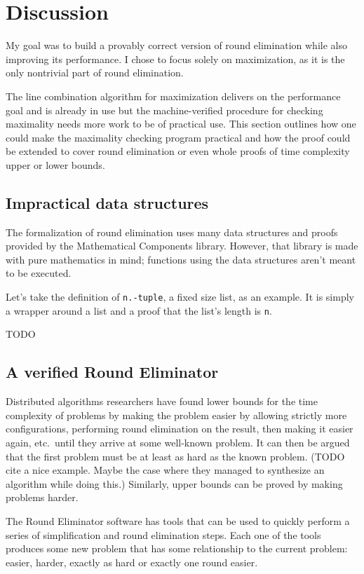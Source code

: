 \documentclass[english, 12pt, a4paper, sci, a-1b, online]{aaltothesis}
\newcommand\icoq[1]{\texttt{#1}}
\begin{document}
\section{Discussion}

My goal was to build a provably correct version of round elimination while also improving its performance. I chose to focus solely on maximization, as it is the only nontrivial part of round elimination.

The line combination algorithm for maximization delivers on the performance goal and is already in use but the machine-verified procedure for checking maximality needs more work to be of practical use. This section outlines how one could make the maximality checking program practical and how the proof could be extended to cover round elimination or even whole proofs of time complexity upper or lower bounds.

\subsection{Impractical data structures}\label{badds}

The formalization of round elimination uses many data structures and proofs provided by the Mathematical Components library. However, that library is made with pure mathematics in mind; functions using the data structures aren't meant to be executed.

Let's take the definition of \icoq{n.-tuple}, a fixed size list, as an example. It is simply a wrapper around a list and a proof that the list's length is \icoq{n}.

TODO

\subsection{A verified Round Eliminator}

Distributed algorithms researchers have found lower bounds for the time complexity of problems by making the problem easier by allowing strictly more configurations, performing round elimination on the result, then making it easier again, etc.\ until they arrive at some well-known problem. It can then be argued that the first problem must be at least as hard as the known problem. (TODO cite a nice example. Maybe the case where they managed to synthesize an algorithm while doing this.) Similarly, upper bounds can be proved by making problems harder.

The Round Eliminator software has tools that can be used to quickly perform a series of simplification and round elimination steps. Each one of the tools produces some new problem that has some relationship to the current problem: easier, harder, exactly as hard or exactly one round easier.
\end{document}
